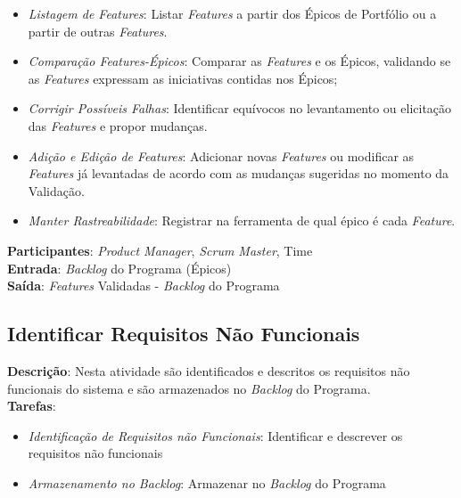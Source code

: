   \begin{itemize}
   \item \indent \textit{Listagem de \textit{Features}}:  Listar \textit{Features} a partir dos Épicos de Portfólio ou a partir de outras \textit{Features}.
   
   \item \indent \textit{Comparação \textit{Features}-Épicos}: Comparar as \textit{Features} e os Épicos, validando se as \textit{Features} expressam as iniciativas contidas nos Épicos;

   \item \indent \textit{Corrigir Possíveis Falhas}: Identificar equívocos no levantamento ou elicitação das \textit{Features} e propor mudanças.

   \item \indent \textit{Adição e Edição de \textit{Features}}: Adicionar novas \textit{Features} ou modificar as \textit{Features} já levantadas de acordo com as mudanças sugeridas no momento da Validação.

   \item \indent \textit{Manter Rastreabilidade}: Registrar na ferramenta de qual épico é cada \textit{Feature}.
   \end{itemize}

\textbf{Participantes}: \textit{Product Manager}, \textit{Scrum Master}, Time \\

\textbf{Entrada}: \textit{Backlog} do Programa (Épicos) \\

\textbf{Saída}:  \textit{Features} Validadas - \textit{Backlog} do Programa  \\


\subsection{Identificar Requisitos Não Funcionais}
  \textbf{Descrição}: Nesta atividade são identificados e descritos os requisitos não funcionais do sistema e são armazenados no \textit{Backlog} do Programa.  \\

  \textbf{Tarefas}:
  \begin{itemize}
   \item \indent \textit{Identificação de Requisitos não Funcionais}: Identificar e descrever os requisitos não funcionais

   \item \indent \textit{Armazenamento no \textit{Backlog}}: Armazenar no \textit{Backlog} do Programa
  \end{itemize}

